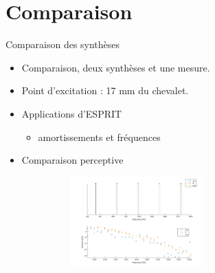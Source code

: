 \section{Comparaison}

\begin{frame}{Comparaison des synthèses}
 \begin{itemize}
  \item Comparaison, deux synthèses et une mesure.
  \item Point d'excitation : 17 mm du chevalet.
  \item Applications d'ESPRIT
  \begin{itemize}
    \item amortissements et fréquences
  \end{itemize}
  \item Comparaison perceptive
 \end{itemize}
 
      \begin{figure}
		\centering
		\includegraphics[width=8cm,height=3.5cm]{figures/apotheose}
	\end{figure}
\end{frame}
